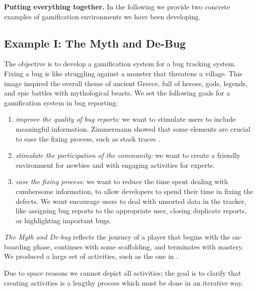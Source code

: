 {\bf Putting everything together.} In the following we provide two concrete examples of gamification environments we have been developing.

\subsection{Example I: The Myth and De-Bug}\label{sec:example-bugs}

The objective is to develop a gamification system for a bug tracking system. Fixing a bug is like struggling against a monster that threatens a village. This image inspired the overall theme of ancient Greece, full of heroes, gods, legends, and epic battles with mythological beasts. We set the following goals for a gamification system in bug reporting:
\begin{enumerate}[(1)]
	\item {\em improve the quality of bug reports:} we want to stimulate users to include meaningful information. Zimmermann \etal showed that some elements are crucial to ease the fixing process, such as stack traces \cite{Zimm2010a}. 
	\item {\em stimulate the participation of the community:} we want to create a friendly environment for newbies and with engaging activities for experts.
	\item {\em ease the fixing process:} we want to reduce the time spent dealing with cumbersome information, to allow developers to spend their time in fixing the defects. We want encourage users to deal with unsorted data in the tracker, like assigning bug reports to the appropriate user, closing duplicate reports, or highlighting important bugs.
\end{enumerate}

\textit{The Myth and De-bug} reflects the journey of a player that begins with the on-boarding phase, continues with some scaffolding, and terminates with mastery. We produced a large set of activities, such as the one in .


Due to space reasons we cannot depict all activities; the goal is to clarify that creating activities is a lengthy process which must be done in an iterative way.

